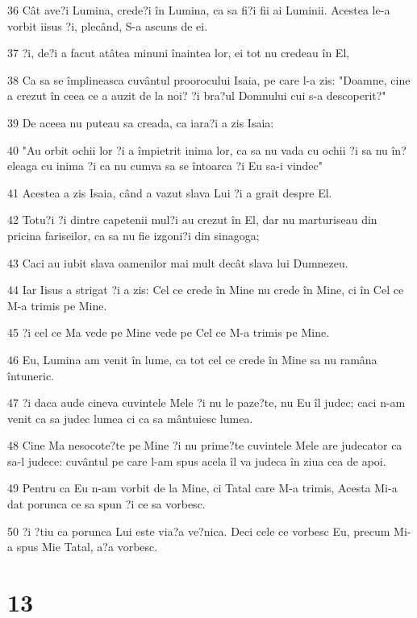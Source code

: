 \par 36 Cât ave?i Lumina, crede?i în Lumina, ca sa fi?i fii ai Luminii. Acestea le-a vorbit iisus ?i, plecând, S-a ascuns de ei.
\par 37 ?i, de?i a facut atâtea minuni înaintea lor, ei tot nu credeau în El,
\par 38 Ca sa se împlineasca cuvântul proorocului Isaia, pe care l-a zis: "Doamne, cine a crezut în ceea ce a auzit de la noi? ?i bra?ul Domnului cui s-a descoperit?"
\par 39 De aceea nu puteau sa creada, ca iara?i a zis Isaia:
\par 40 "Au orbit ochii lor ?i a împietrit inima lor, ca sa nu vada cu ochii ?i sa nu în?eleaga cu inima ?i ca nu cumva sa se întoarca ?i Eu sa-i vindec"
\par 41 Acestea a zis Isaia, când a vazut slava Lui ?i a grait despre El.
\par 42 Totu?i ?i dintre capetenii mul?i au crezut în El, dar nu marturiseau din pricina fariseilor, ca sa nu fie izgoni?i din sinagoga;
\par 43 Caci au iubit slava oamenilor mai mult decât slava lui Dumnezeu.
\par 44 Iar Iisus a strigat ?i a zis: Cel ce crede în Mine nu crede în Mine, ci în Cel ce M-a trimis pe Mine.
\par 45 ?i cel ce Ma vede pe Mine vede pe Cel ce M-a trimis pe Mine.
\par 46 Eu, Lumina am venit în lume, ca tot cel ce crede în Mine sa nu ramâna întuneric.
\par 47 ?i daca aude cineva cuvintele Mele ?i nu le paze?te, nu Eu îl judec; caci n-am venit ca sa judec lumea ci ca sa mântuiesc lumea.
\par 48 Cine Ma nesocote?te pe Mine ?i nu prime?te cuvintele Mele are judecator ca sa-l judece: cuvântul pe care l-am spus acela îl va judeca în ziua cea de apoi.
\par 49 Pentru ca Eu n-am vorbit de la Mine, ci Tatal care M-a trimis, Acesta Mi-a dat porunca ce sa spun ?i ce sa vorbesc.
\par 50 ?i ?tiu ca porunca Lui este via?a ve?nica. Deci cele ce vorbesc Eu, precum Mi-a spus Mie Tatal, a?a vorbesc.

\chapter{13}

